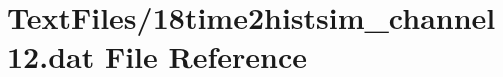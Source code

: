 \hypertarget{18time2histsim__channel12_8dat}{}\section{Text\+Files/18time2histsim\+\_\+channel12.dat File Reference}
\label{18time2histsim__channel12_8dat}
